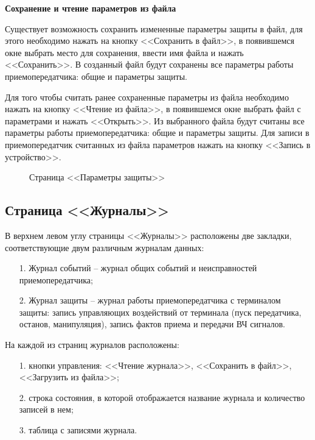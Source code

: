 \textbf{Сохранение и чтение параметров из файла}

Существует возможность сохранить измененные параметры защиты в файл, для этого необходимо нажать на кнопку <<Сохранить в файл>>, в появившемся окне выбрать место для сохранения, ввести имя файла и нажать <<Сохранить>>. В созданный файл будут сохранены все параметры работы приемопередатчика: общие и параметры защиты.

Для того чтобы считать ранее сохраненные параметры из файла необходимо нажать на кнопку <<Чтение из файла>>, в появившемся окне выбрать файл с параметрами и нажать <<Открыть>>. Из выбранного файла будут считаны все параметры работы приемопередатчика: общие и параметры защиты. Для записи в приемопередатчик считанных из файла параметров нажать на кнопку <<Запись в устройство>>.

\begin{figure}[H]
	
	\caption{Страница <<Параметры защиты>>}
	\label{fig:configurator_param_def}
\end{figure}


\subsection{Страница <<Журналы>>}	\label{ssec:configurator_journal}

В верхнем левом углу страницы <<Журналы>> расположены две закладки, соответствующие двум различным журналам данных:
\begin{enumerate}
	\item[1.] Журнал событий – журнал общих событий и неисправностей приемопередатчика;
	\item[2.] Журнал защиты – журнал работы приемопередатчика с терминалом защиты: запись управляющих воздействий от терминала (пуск передатчика, останов, манипуляция), запись фактов приема и передачи ВЧ сигналов.
\end{enumerate}

На каждой из страниц журналов расположены:
\begin{enumerate}
	\item[1.] кнопки управления: <<Чтение журнала>>, <<Сохранить в файл>>, <<Загрузить из файла>>;
	\item[2.] строка состояния, в которой отображается название журнала и количество записей в нем;
	\item[3.] таблица с записями журнала.
\end{enumerate}

